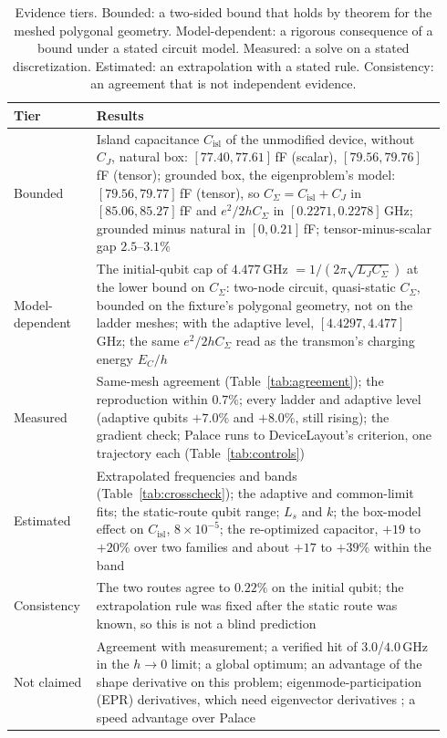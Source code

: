 \documentclass{anvil-paper}
\newcommand{\Cisl}{C_{\mathrm{isl}}}
\begin{document}
\begin{table}[htbp]
  \centering
  \caption{Evidence tiers. Bounded: a two-sided bound that holds by theorem
  for the meshed polygonal geometry. Model-dependent: a rigorous consequence of a
  bound under a stated circuit model. Measured: a solve on a stated
  discretization. Estimated: an extrapolation with a stated rule.
  Consistency: an agreement that is not independent evidence.}
  \label{tab:tiers}
  \footnotesize
  \begin{tabular}{@{}>{\raggedright\arraybackslash}p{0.17\linewidth}>{\raggedright\arraybackslash}p{0.77\linewidth}@{}}
    \toprule
    Tier & Results \\
    \midrule
    Bounded & Island capacitance $\Cisl$ of the unmodified device, without $C_J$, natural box: $[77.40, 77.61]$\,fF (scalar), $[79.56, 79.76]$\,fF (tensor); grounded box, the eigenproblem's model: $[79.56, 79.77]$\,fF (tensor), so $C_\Sigma = \Cisl + C_J$ in $[85.06, 85.27]$\,fF and $e^2/2hC_\Sigma$ in $[0.2271, 0.2278]$\,GHz; grounded minus natural in $[0, 0.21]$\,fF; tensor-minus-scalar gap $2.5$--$3.1\%$ \\
    Model-dependent & The initial-qubit cap of $4.477$\,GHz $= 1/(2\pi\sqrt{L_J C_\Sigma})$ at the lower bound on $C_\Sigma$: two-node circuit, quasi-static $C_\Sigma$, bounded on the fixture's polygonal geometry, not on the ladder meshes; with the adaptive level, $[4.4297, 4.477]$\,GHz; the same $e^2/2hC_\Sigma$ read as the transmon's charging energy $E_C/h$ \\
    Measured & Same-mesh agreement (Table~\ref{tab:agreement}); the reproduction within $0.7\%$; every ladder and adaptive level (adaptive qubits $+7.0\%$ and $+8.0\%$, still rising); the gradient check; Palace runs to DeviceLayout's criterion, one trajectory each (Table~\ref{tab:controls}) \\
    Estimated & Extrapolated frequencies and bands (Table~\ref{tab:crosscheck}); the adaptive and common-limit fits; the static-route qubit range; $L_s$ and $k$; the box-model effect on $\Cisl$, $8\times10^{-5}$; the re-optimized capacitor, $+19$ to $+20\%$ over two families and about $+17$ to $+39\%$ within the band \\
    Consistency & The two routes agree to $0.22\%$ on the initial qubit; the extrapolation rule was fixed after the static route was known, so this is not a blind prediction \\
    Not claimed & Agreement with measurement; a verified hit of $3.0$/$4.0$\,GHz in the $h \to 0$ limit; a global optimum; an advantage of the shape derivative on this problem; eigenmode-participation (EPR) derivatives, which need eigenvector derivatives \citep{nelson1976simplified}; a speed advantage over Palace \\
    \bottomrule
  \end{tabular}
\end{table}
\end{document}
